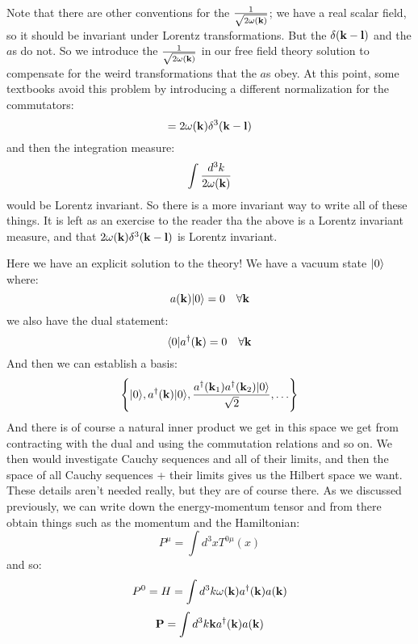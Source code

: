 Note that there are other conventions for the $\frac{1}{\sqrt{2\omega(\mathbf{k})}}$; we have a real scalar field, so it should be invariant under Lorentz transformations. But the $\delta(\mathbf{k} - \mathbf{l})$ and the $a$s do not. So we introduce the $\frac{1}{\sqrt{2\omega(\mathbf{k})}}$ in our free field theory solution to compensate for the weird transformations that the $a$s obey. At this point, some textbooks avoid this problem by introducing a different normalization for the commutators:
\begin{equation}
    [a(\v{k}), a^\dag(\v{l})] = 2\omega(\v{k})\delta^3(\v{k} - \v{l})
\end{equation}
and then the integration measure:
\begin{equation}
    \int \frac{d^3k}{2\omega(\mathbf{k})}
\end{equation}
would be Lorentz invariant. So there is a more invariant way to write all of these things. It is left as an exercise to the reader tha the above is a Lorentz invariant measure, and that $2\omega(\mathbf{k})\delta^3(\mathbf{k} - \mathbf{l})$ is Lorentz invariant.

Here we have an explicit solution to the theory! We have a vacuum state $\lvert 0 \rangle$ where:
\begin{equation}
    a(\mathbf{k})\lvert 0 \rangle = 0 \quad \forall \mathbf{k}
\end{equation}
we also have the dual statement:
\begin{equation}
    \langle 0 \rvert a^\dagger(\mathbf{k}) = 0 \quad \forall \mathbf{k}
\end{equation}
And then we can establish a basis:
\begin{equation}
    \set{\lvert 0 \rangle, a^\dagger(\ensuremath{\mathbf{k}})\lvert 0 \rangle, \frac{a^\dagger(\ensuremath{\mathbf{k}}_1)a^\dagger(\ensuremath{\mathbf{k}}_2)\lvert 0 \rangle}{\sqrt{2}}, \ldots }
\end{equation}
And there is of course a natural inner product we get in this space we get from contracting with the dual and using the commutation relations and so on. We then would investigate Cauchy sequences and all of their limits, and then the space of all Cauchy sequences + their limits gives us the Hilbert space we want. These details aren't needed really, but they are of course there. As we discussed previously, we can write down the energy-momentum tensor and from there obtain things such as the momentum and the Hamiltonian:
\begin{equation}
    P^\mu = \int d^3 x T^{0\mu}(x) 
\end{equation}
and so:
\begin{equation}
    P^0 = H = \int d^3k \omega(\mathbf{k})a^\dagger(\mathbf{k})a(\mathbf{k})
\end{equation}
\begin{equation}
    \mathbf{P} = \int d^3k \mathbf{k}a^\dagger(\mathbf{k})a(\mathbf{k})
\end{equation}

